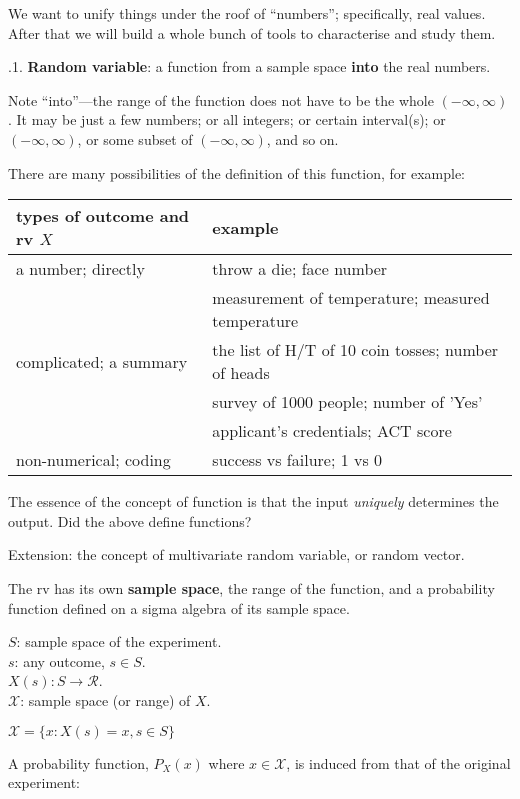 \documentclass[12pt]{article}
\begin{document}
We want to unify things under the roof of ``numbers''; specifically,
real values. After that we will build a whole bunch of tools to
characterise and study them.

.1. \textbf{Random variable}:
a function from a sample space \textbf{into} the real numbers.

Note ``into''---the range of the function does not have to be the whole
$(-\infty, \infty)$.
It may be just a few numbers; or all integers; or certain interval(s);
or $(-\infty, \infty)$, or some subset of $(-\infty, \infty)$,
and so on.

There are many possibilities of the definition of this function,
for example:

\begin{tabular}{ll}
types of outcome and rv $X$ & example \\ \hline
a number; directly & throw a die; face number\\
    & measurement of temperature; measured temperature\\
complicated; a summary & the list of H/T of 10 coin tosses; number of heads\\
    & survey of 1000 people; number of 'Yes'\\
    & applicant's credentials; ACT score\\
non-numerical; coding & success vs failure; 1 vs 0
\\ \hline
\end{tabular}

The essence of the concept of function is that
the input \emph{uniquely} determines the output.
Did the above define functions?

Extension: the concept of multivariate random variable, or random
vector.

The rv has its own \textbf{sample space}, \ie the range of the function,
and a probability function defined on a sigma algebra of its sample
space.

$S$: sample space of the experiment.\\
$s$: any outcome, $s \in S$.\\
$X(s) : S \rightarrow \mathcal{R}$.\\
$\mathcal{X}$: sample space (or range) of $X$.

$\mathcal{X} = \{x: X(s) = x, s \in S\}$

\bigskip

A probability function,
$P_X(x)$ where $x \in \mathcal{X}$,
is induced from that of the original experiment:
\end{document}
